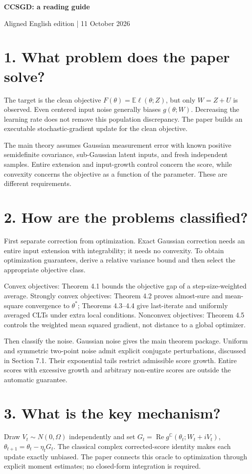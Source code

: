 \documentclass[11pt]{article}
\begin{document}
{\LARGE\bfseries CCSGD: a reading guide}\par{\small Aligned English edition | 11 October 2026}\par

\section*{1. What problem does the paper solve?}
The target is the clean objective $F(\theta)=\mathbb E\ell(\theta;Z)$, but only $W=Z+U$ is observed. Even centered input noise generally biases $g(\theta;W)$. Decreasing the learning rate does not remove this population discrepancy. The paper builds an executable stochastic-gradient update for the clean objective.

The main theory assumes Gaussian measurement error with known positive semidefinite covariance, sub-Gaussian latent inputs, and fresh independent samples. Entire extension and input-growth control concern the score, while convexity concerns the objective as a function of the parameter. These are different requirements.


\section*{2. How are the problems classified?}
First separate correction from optimization. Exact Gaussian correction needs an entire input extension with integrability; it needs no convexity. To obtain optimization guarantees, derive a relative variance bound and then select the appropriate objective class.

Convex objectives: Theorem 4.1 bounds the objective gap of a step-size-weighted average. Strongly convex objectives: Theorem 4.2 proves almost-sure and mean-square convergence to $\theta^*$; Theorems 4.3--4.4 give last-iterate and uniformly averaged CLTs under extra local conditions. Nonconvex objectives: Theorem 4.5 controls the weighted mean squared gradient, not distance to a global optimizer.

Then classify the noise. Gaussian noise gives the main theorem package. Uniform and symmetric two-point noise admit explicit conjugate perturbations, discussed in Section 7.1. Their exponential tails restrict admissible score growth. Entire scores with excessive growth and arbitrary non-entire scores are outside the automatic guarantee.


\section*{3. What is the key mechanism?}
Draw $V_t\sim N(0,\Omega)$ independently and set $G_t=\operatorname{Re}g^{\mathbb C}(\theta_t;W_t+iV_t)$, $\theta_{t+1}=\theta_t-\eta_tG_t$. The classical complex corrected-score identity makes each update exactly unbiased. The paper connects this oracle to optimization through explicit moment estimates; no closed-form integration is required.
\end{document}
